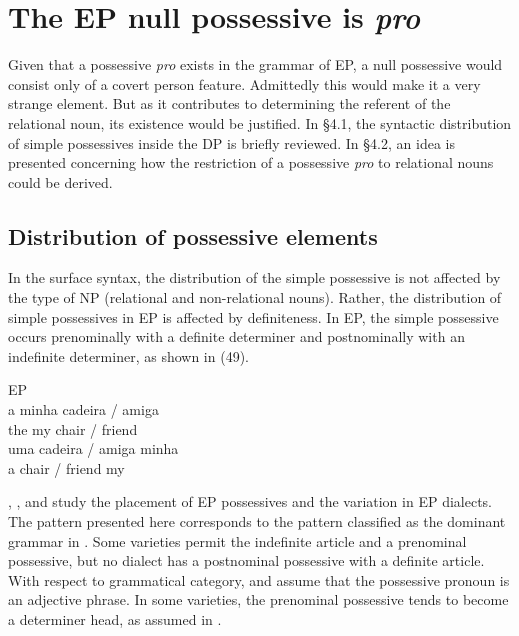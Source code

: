 \documentclass[output=paper]{langsci/langscibook}
\begin{document}
\section{The EP null possessive is \textit{pro}}%

Given that a possessive \textit{pro} exists in the grammar of EP, a null possessive would consist only of a covert person feature. Admittedly this would make it a very strange element. But as it contributes to determining the referent of the relational noun, its existence would be justified. In §4.1, the syntactic distribution of simple possessives inside the DP is briefly reviewed. In §4.2, an idea is presented concerning how the restriction of a possessive \textit{pro} to relational nouns could be derived.

\subsection{Distribution of possessive elements}%

In the surface syntax, the distribution of the simple possessive is not affected by the type of NP (relational and non-relational nouns). Rather, the distribution of simple possessives in EP is affected by definiteness. In EP, the simple possessive occurs prenominally with a definite determiner and postnominally with an indefinite determiner, as shown in (49).

\ea%
         EP\label{ex:wein:49}\\
    \ea  
    \gll a minha cadeira / amiga\\
         the my chair / friend\\
    \ex  
    \gll uma cadeira / amiga minha\\
         a chair / friend my\\
    \z
\z

\citet{Brito2007}, \citet{Castro2003,Castro2005,Castro2007}, and \citet{Miguel2002estatuto,Miguel2002para,Miguel2004} study the placement of EP possessives and the variation in EP dialects. The pattern presented here corresponds to the pattern classified as the dominant grammar in \citet{Brito2007}. Some varieties permit the indefinite article and a prenominal possessive, but no dialect has a postnominal possessive with a definite article. With respect to grammatical category, \citet{Brito2007} and \citet{Miguel2002estatuto,Miguel2002para} assume that the possessive pronoun is an adjective phrase. In some varieties, the prenominal possessive tends to become a determiner head, as assumed in \citet{Castro2003}.
\end{document}
